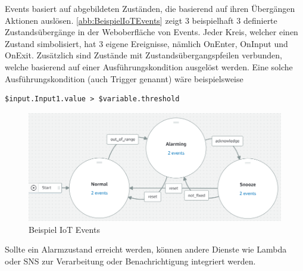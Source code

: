 \AWSIOT Events basiert auf abgebildeten Zuständen, die basierend auf ihren Übergängen Aktionen auslösen. \autoref{abb:BeispielIoTEvents} zeigt 3 beispielhaft 3 definierte Zustandsübergänge in der Weboberfläche von \AWSIOT Events. Jeder Kreis, welcher einen Zustand simbolisiert, hat 3 eigene Ereignisse, nämlich OnEnter, OnInput und OnExit. Zusätzlich sind Zustände mit Zustandsübergangspfeilen verbunden, welche basierend auf einer Ausführungskondition ausgelöst werden. Eine solche Ausführungskondition (auch Trigger genannt) wäre beispielsweise
\begin{lstlisting}
$input.Input1.value > $variable.threshold
\end{lstlisting}
\begin{figure}[H]
\centering
\includegraphics[width=\textwidth]{graphics/IoT-Events-Demo.png}
\caption{Beispiel IoT Events}
\label{abb:BeispielIoTEvents}
\end{figure}
Sollte ein Alarmzustand erreicht werden, können andere Dienste wie Lambda oder \ac{SNS} zur Verarbeitung oder Benachrichtigung integriert werden.


